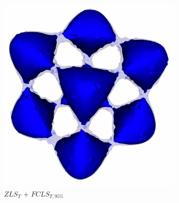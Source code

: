 \begin{figure}[t]
\begin{subfigure}{0.195\linewidth}
\centering
\includegraphics[width=0.8\linewidth]{Images/Tangle/fcls_95.pdf}
\caption{$ZLS_{T}$ + $FCLS_{T,95\%}$}
\label{}
\end{subfigure}
\caption{}
\label{}
\end{figure}
